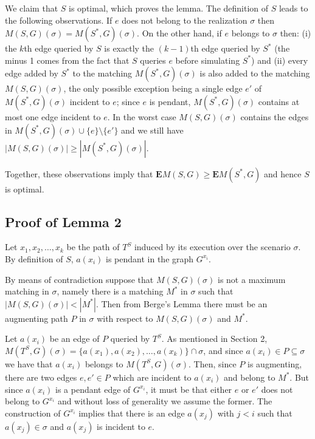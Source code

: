 \documentclass[12pt]{article}
\newcommand{\Mf}[2]{M(#1,#2)}
\newcommand{\EMf}[2]{\mathbf{E}M(#1,#2)}
\newcommand{\prelim}[0]{2}
\begin{document}
		We claim that $S$ is optimal, which proves the lemma. The definition of $S$ leads to the following observations. If $e$ does not belong to the realization $\sigma$ then $\Mf{S}{G}(\sigma) = \Mf{S^*}{G}(\sigma)$. On the other hand, if $e$ belongs to $\sigma$ then: (i) the $k$th edge queried by $S$ is exactly the $(k - 1)$th edge queried by $S^*$ (the minus 1 comes from the fact that $S$ queries $e$ before simulating $S^*$) and (ii) every edge added by $S^*$ to the matching $\Mf{S^*}{G}(\sigma)$ is also added to the matching $\Mf{S}{G}(\sigma)$, the only possible exception being a single edge $e'$ of $\Mf{S^*}{G}(\sigma)$ incident to $e$; since $e$ is pendant, $\Mf{S^*}{G}(\sigma)$ contains at most one edge incident to $e$. In the worst case $\Mf{S}{G}(\sigma)$ contains the edges in $\Mf{S^*}{G}(\sigma) \cup \{e\} \setminus \{e'\}$ and we still have $|\Mf{S}{G}(\sigma)| \ge |\Mf{S^*}{G}(\sigma)|$. 
		
		Together, these observations imply that $\EMf{S}{G} \ge \EMf{S^*}{G}$ and hence $S$ is optimal.
	

	\subsection{Proof of Lemma 2}
	


Let $x_1, x_2, \ldots, x_k$ be the path of $T^S$ induced by its execution over the scenario $\sigma$. By definition of $S$, $a(x_i)$ is pendant in the graph $G^{x_i}$.
		
		By means of contradiction suppose that $\Mf{S}{G}(\sigma)$ is not a maximum matching in $\sigma$, namely there is a matching $M^*$ in $\sigma$ such that $|\Mf{S}{G}(\sigma)| < |M^*|$. Then from Berge's Lemma \cite{lovasz} there must be an augmenting path $P$ in $\sigma$ with respect to $\Mf{S}{G}(\sigma)$ and $M^*$.
		
		Let $a(x_i)$ be an edge of $P$ queried by $T^S$. As mentioned in Section \prelim, $\Mf{T^S}{G}(\sigma) = \{a(x_1), a(x_2), \ldots, a(x_k)\} \cap \sigma$, and since $a(x_i) \in P \subseteq \sigma$ we have that $a(x_i)$ belongs to $\Mf{T^S}{G}(\sigma)$. Then, since $P$ is augmenting, there are two edges $e, e' \in P$ which are incident to $a(x_i)$ and belong to $M^*$. But since $a(x_i)$ is a pendant edge of $G^{x_i}$, it must be that either $e$ or $e'$ does not belong to $G^{x_i}$ and without loss of generality we assume the former. The construction of $G^{x_i}$ implies that there is an edge $a(x_j)$ with $j < i$ such that $a(x_j) \in \sigma$ and $a(x_j)$ is incident to $e$. 
		
\end{document}
